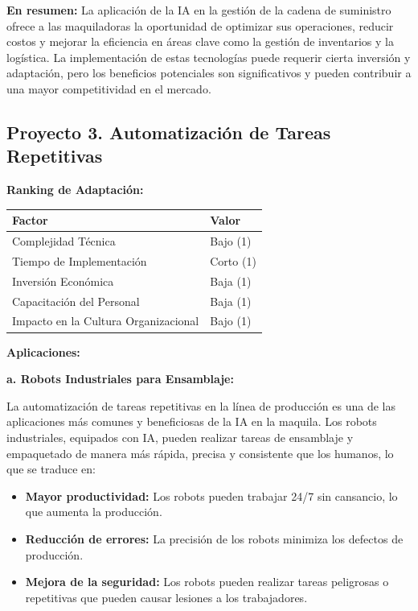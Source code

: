 \documentclass[
  10pt,
  letterpaper,
]{book}
\providecommand{\tightlist}{%
  \setlength{\itemsep}{0pt}\setlength{\parskip}{0pt}}\usepackage{longtable,booktabs,array}
\begin{document}
\textbf{En resumen:} La aplicación de la IA en la gestión de la cadena
de suministro ofrece a las maquiladoras la oportunidad de optimizar sus
operaciones, reducir costos y mejorar la eficiencia en áreas clave como
la gestión de inventarios y la logística. La implementación de estas
tecnologías puede requerir cierta inversión y adaptación, pero los
beneficios potenciales son significativos y pueden contribuir a una
mayor competitividad en el mercado.

\subsection{Proyecto 3. Automatización de Tareas
Repetitivas}\label{proyecto-3.-automatizaciuxf3n-de-tareas-repetitivas}

\textbf{Ranking de Adaptación:}

\begin{longtable}[]{@{}ll@{}}
\toprule\noalign{}
Factor & Valor \\
\midrule\noalign{}
\endhead
\bottomrule\noalign{}
\endlastfoot
Complejidad Técnica & Bajo (1) \\
Tiempo de Implementación & Corto (1) \\
Inversión Económica & Baja (1) \\
Capacitación del Personal & Baja (1) \\
Impacto en la Cultura Organizacional & Bajo (1) \\
\end{longtable}

\textbf{Aplicaciones:}

\textbf{a. Robots Industriales para Ensamblaje:}

La automatización de tareas repetitivas en la línea de producción es una
de las aplicaciones más comunes y beneficiosas de la IA en la maquila.
Los robots industriales, equipados con IA, pueden realizar tareas de
ensamblaje y empaquetado de manera más rápida, precisa y consistente que
los humanos, lo que se traduce en:

\begin{itemize}
\tightlist
\item
  \textbf{Mayor productividad:} Los robots pueden trabajar 24/7 sin
  cansancio, lo que aumenta la producción.
\item
  \textbf{Reducción de errores:} La precisión de los robots minimiza los
  defectos de producción.
\item
  \textbf{Mejora de la seguridad:} Los robots pueden realizar tareas
  peligrosas o repetitivas que pueden causar lesiones a los
  trabajadores.
\end{itemize}
\end{document}
